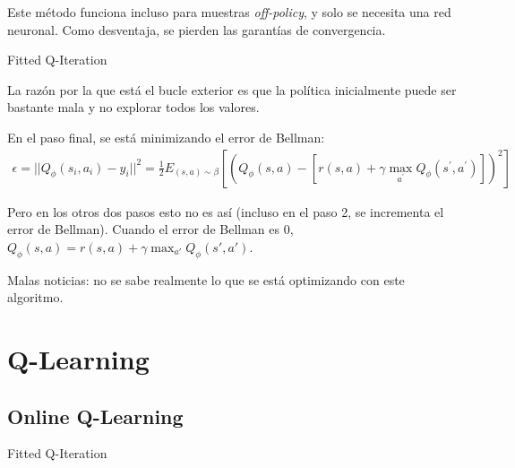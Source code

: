 Este método funciona incluso para muestras \textit{off-policy}, y solo se necesita una red
neuronal. Como desventaja, se pierden las garantías de convergencia.

\begin{algorithm}
    \caption{Fitted Q-Iteration}
\end{algorithm}

La razón por la que está el bucle exterior es que la política inicialmente puede ser
bastante mala y no explorar todos los valores.

En el paso final, se está minimizando el error de Bellman:
\begin{align}
\epsilon = ||Q_\phi(s_i,a_i)-y_i||^2 = \frac { 1 } { 2 } E _ { ( s , a ) \sim \beta } [ ( Q _ { \phi } ( s , a ) - [ r ( s , a ) + \gamma \operatorname { max } _ { a ^ { \prime } } Q _ { \phi } ( s ^ { \prime } , a ^ { \prime } ) ] ) ^ { 2 } ]
\end{align}

Pero en los otros dos pasos esto no es así (incluso en el paso 2, se incrementa el error de
Bellman). Cuando el error de Bellman es 0,
$Q_\phi(s,a)=r(s,a)+\gamma\max_{a'}Q_\phi(s',a')$.

Malas noticias: no se sabe realmente lo que se está optimizando con este algoritmo.

\section{Q-Learning}%
\label{sec:q_learning}

\subsection{Online Q-Learning}%
\label{sub:online_q_learning}

\begin{algorithm}
    \caption{Fitted Q-Iteration}
\end{algorithm} 


